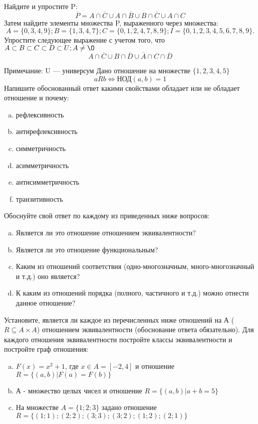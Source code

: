 \documentclass[10pt]{exam}
\begin{document}
\begin{questions}
\question
Найдите и упростите P:
\begin{equation*}
\overline{P} = A \cap \overline{C} \cup A \cap \overline{B} \cup B \cap \overline{C} \cup A \cap C
\end{equation*}
Затем найдите элементы множества P, выраженного через множества:
\begin{equation*}
A = \{0, 3, 4, 9\}; 
B = \{1, 3, 4, 7\};
C = \{0, 1, 2, 4, 7, 8, 9\};
I = \{0, 1, 2, 3, 4, 5, 6, 7, 8, 9\}.
\end{equation*}\question
Упростите следующее выражение с учетом того, что $A\subset B \subset C \subset D \subset U; A \neq \O$
\begin{equation*}
A \cap  \overline{C} \cup B \cap \overline{D} \cup  \overline{A} \cap C \cap  \overline{D}
\end{equation*}

Примечание: U — универсум\question
Дано отношение на множестве $\{1, 2, 3, 4, 5\}$ 
\begin{equation*}
aRb \iff  \text{НОД}(a,b) =1
\end{equation*}
Напишите обоснованный ответ какими свойствами обладает или не обладает отношение и почему:   
\begin{enumerate} [a)]\setcounter{enumi}{0}
\item рефлексивность
\item антирефлексивность
\item симметричность
\item асимметричность
\item антисимметричность
\item транзитивность
\end{enumerate}

Обоснуйте свой ответ по каждому из приведенных ниже вопросов:
\begin{enumerate} [a)]\setcounter{enumi}{0}
    \item Является ли это отношение отношением эквивалентности?
    \item Является ли это отношение функциональным?
    \item Каким из отношений соответствия (одно-многозначным, много-многозначный и т.д.) оно является?
    \item К каким из отношений порядка (полного, частичного и т.д.) можно отнести данное отношение?
\end{enumerate}


\question
Установите, является ли каждое из перечисленных ниже отношений на А ($R \subseteq A \times A$) отношением эквивалентности (обоснование ответа обязательно). Для каждого отношения эквивалентности постройте классы эквивалентности и постройте граф отношения:
\begin{enumerate} [a)]\setcounter{enumi}{0}
\item $F(x)=x^{2}+1$, где $x \in A = [-2, 4]$ и отношение $R = \{(a,b)|F(a) = F(b)\}$
\item А - множество целых чисел и отношение $R = \{(a,b)|a + b = 5\}$
\item На множестве $A = \{1; 2; 3\}$ задано отношение $R = \{(1; 1); (2; 2); (3; 3); (3; 2); (1; 2); (2; 1)\}$


\end{enumerate}
\end{questions}
\end{document}
